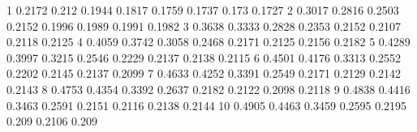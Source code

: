 1	0.2172	0.212	0.1944	0.1817	0.1759	0.1737	0.173	0.1727
2	0.3017	0.2816	0.2503	0.2152	0.1996	0.1989	0.1991	0.1982
3	0.3638	0.3333	0.2828	0.2353	0.2152	0.2107	0.2118	0.2125
4	0.4059	0.3742	0.3058	0.2468	0.2171	0.2125	0.2156	0.2182
5	0.4289	0.3997	0.3215	0.2546	0.2229	0.2137	0.2138	0.2115
6	0.4501	0.4176	0.3313	0.2552	0.2202	0.2145	0.2137	0.2099
7	0.4633	0.4252	0.3391	0.2549	0.2171	0.2129	0.2142	0.2143
8	0.4753	0.4354	0.3392	0.2637	0.2182	0.2122	0.2098	0.2118
9	0.4838	0.4416	0.3463	0.2591	0.2151	0.2116	0.2138	0.2144
10	0.4905	0.4463	0.3459	0.2595	0.2195	0.209	0.2106	0.209
